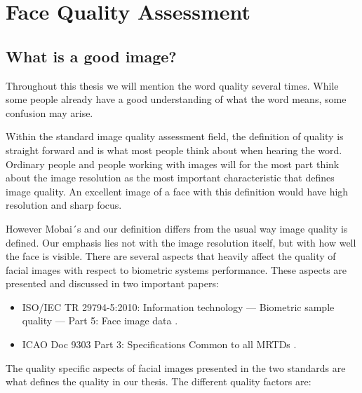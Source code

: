 \chapter{Face Quality Assessment}
\label{chap:FQA}

\section{What is a good image?}
\label{sec:setup}
Throughout this thesis we will mention the word quality several times. While some people already have a good understanding of what the word means, some confusion may arise. 

Within the standard image quality assessment field, the definition of quality is straight forward and is what most people think about when hearing the word. Ordinary people and people working with images will for the most part think about the image resolution as the most important characteristic that defines image quality. An excellent image of a face with this definition would have high resolution and sharp focus.   

However Mobai´s and our definition differs from the usual way image quality is defined. Our emphasis lies not with the image resolution itself, but with how well the face is visible. There are several aspects that heavily affect the quality of facial images with respect to biometric systems performance. These aspects are presented and discussed in two important papers: 

\begin{itemize}
    \item ISO/IEC TR 29794-5:2010: Information technology — Biometric sample quality — Part 5: Face image data \cite{ISO50912}.
    \item ICAO Doc 9303 Part 3: Specifications Common to all MRTDs \cite{ICAO1}. 
\end{itemize}

The quality specific aspects of facial images presented in the two standards are what defines the quality in our thesis. The different quality factors are:  

